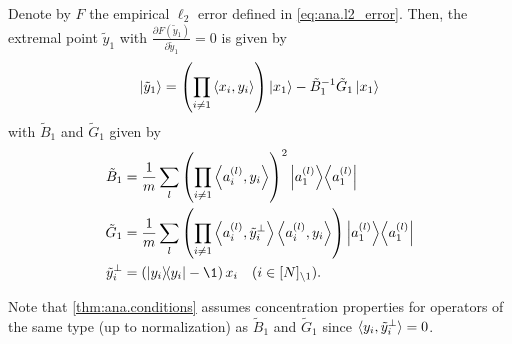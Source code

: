\begin{lemma}%
  \label{lem:ana.gradient_of_error}
  Denote by $F$ the empirical $\ell_2$ error defined in \cref{eq:ana.l2_error}.
  Then, the extremal point $\tilde y_1$ with $\frac{\partial F(\tilde y_1)}{\partial \tilde y_1} = 0$ is given by
  \[
    \Ket{\tilde y_1} = {\left( \prod_{i \neq 1} \Braket{x_i, y_i} \right)} \Ket{x_1} - \tilde B_1^{-1} \tilde G_1 \Ket{x_1}
    \label{eq:ana.gradient_of_error}
  \]
  with $\tilde B_1$ and $\tilde G_1$ given by
  \begin{align}
    \label{eq:ana.b_operator}
    \tilde B_1 &= \frac{1}{m} \sum_l {\left( \prod_{i \neq 1} \Braket{a\ind{l}_i,y_i} \right)}^2 \Ketbra{a\ind{l}_1} \\
    \label{eq:ana.g_operator}
    \tilde G_1 &= \frac{1}{m} \sum_l {\left( \prod_{i \neq 1} \Braket{a\ind{l}_i, \tilde y_i^\perp} \Braket{a\ind{l}_i,y_i} \right)}\Ketbra{a\ind{l}_1} \\
    \tilde y_i^\perp &= \left(\ketbra{y_i} - \1 \right) x_i \quad(i \in \NsetSub{1}).
  \end{align}
\end{lemma}
Note that \cref{thm:ana.conditions} assumes concentration properties for operators of the same type (up to normalization) as $\tilde B_1$ and $\tilde G_1$ since $\braket{y_i, \tilde y_i^\perp} = 0$.
